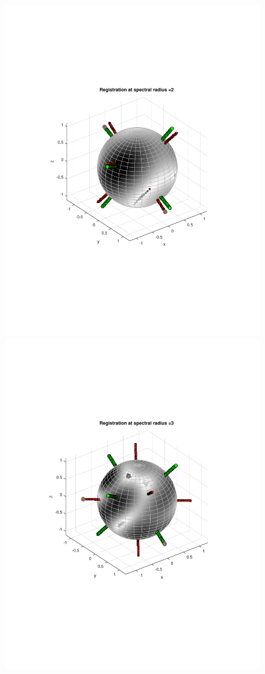 \documentclass{UCF_ETD}
\begin{document}
\begin{figure}[H]
\begin{center}
\includegraphics[scale=0.32]{RobustRegistration/NoisyTransReg_2}
\includegraphics[scale=0.32]{RobustRegistration/NoisyTransReg_3}

\end{center}
\end{figure}
\end{document}

